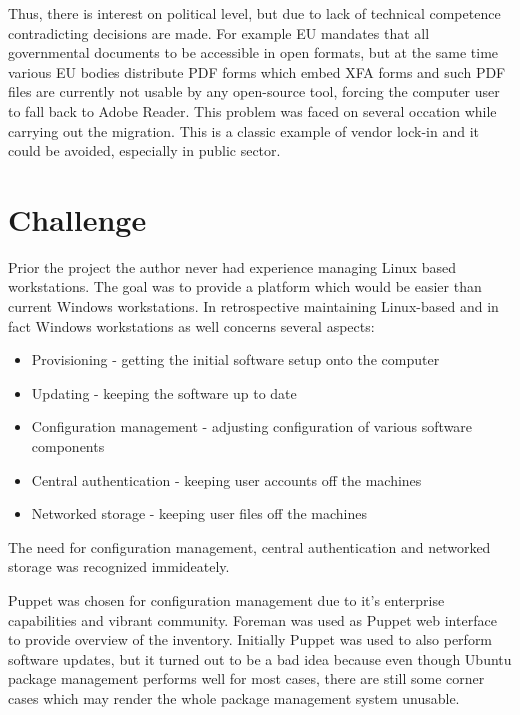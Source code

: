 \documentclass{article}
\begin{document}
Thus, there is interest on political level, but due to lack
of technical competence contradicting decisions are made.
For example EU mandates that all governmental documents to
be accessible in open formats, but at the same time
various EU bodies distribute PDF forms which
embed XFA forms and such PDF files are currently not
usable by any open-source tool, forcing the computer
user to fall back to Adobe Reader.
This problem was faced on several occation while
carrying out the migration.
This is a classic example of vendor lock-in and
it could be avoided, especially in public sector.


\section{Challenge}

Prior the project the author never had experience managing Linux based workstations.
The goal was to provide a platform which would be easier than current Windows
workstations.
In retrospective maintaining Linux-based and in fact
Windows workstations as well concerns several aspects:

\begin{itemize}
\item Provisioning - getting the initial software setup onto the computer
\item Updating - keeping the software up to date
\item Configuration management - adjusting configuration of various software components
\item Central authentication - keeping user accounts off the machines
\item Networked storage - keeping user files off the machines
\end{itemize}

The need for configuration management, central authentication
and networked storage was recognized immideately.


Puppet was chosen for configuration management due to it's
enterprise capabilities and vibrant community.
Foreman was used as Puppet web interface to provide
overview of the inventory.
Initially Puppet was used to also perform software updates, but
it turned out to be a bad idea because even though Ubuntu package
management performs well for most cases, there are still some
corner cases which may render the whole package management
system unusable.
\end{document}
